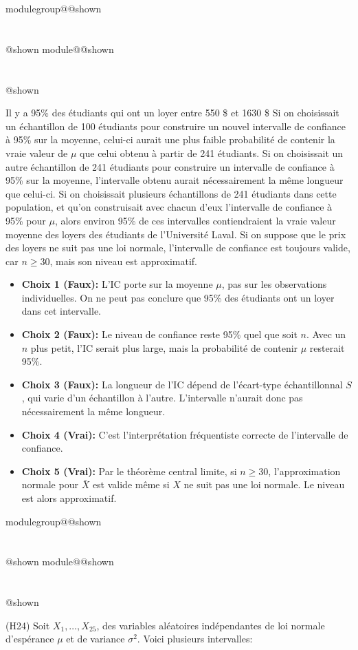 \documentclass{Evaluation}
\makeatletter
\newcommand{\currentmodulekey}{}
\newcommand{\currentmoduletitle}{}
\newcommand{\currentgroupkey}{}
\newcommand{\currentgrouptitle}{}
\newcommand{\showmoduleifneeded}{%
  \ifx\currentgroupkey\empty\else
    \expandafter\ifx\csname modulegroup@\currentgroupkey @shown\endcsname\relax
      \section*{\currentgrouptitle}%
      \expandafter\gdef\csname modulegroup@\currentgroupkey @shown\endcsname{1}%
    \fi
  \fi
  \expandafter\ifx\csname module@\currentmodulekey @shown\endcsname\relax
    \section*{\currentmoduletitle}%
    \expandafter\gdef\csname module@\currentmodulekey @shown\endcsname{1}%
  \fi
}
\newenvironment{H24}{\showmoduleifneeded}{}
\makeatother
\begin{document}
\begin{questions}
\begin{H24}
\begin{checkboxes}
\choice Il y a 95\% des étudiants qui ont un loyer entre 550 \$ et 1630 \$
\choice Si on choisissait un échantillon de 100 étudiants pour construire un nouvel intervalle de confiance à 95\% sur la moyenne, celui-ci aurait une plus faible probabilité de contenir la vraie valeur de $\mu$ que celui obtenu à partir de 241 étudiants.
\choice Si on choisissait un autre échantillon de 241 étudiants pour construire un intervalle de confiance à 95\% sur la moyenne, l'intervalle obtenu aurait nécessairement la même longueur que celui-ci.
\correctchoice Si on choisissait plusieurs échantillons de 241 étudiants dans cette population, et qu'on construisait avec chacun d'eux l'intervalle de confiance à 95\% pour $\mu$, alors environ 95\% de ces intervalles contiendraient la vraie valeur moyenne des loyers des étudiants de l'Université Laval. 
\correctchoice Si on suppose que le prix des loyers ne suit pas une loi normale, l'intervalle de confiance est toujours valide, car $n\geq 30$, mais son niveau est approximatif.
\end{checkboxes}
\begin{solution}
\begin{itemize}
    \item \textbf{Choix 1 (Faux):} L'IC porte sur la moyenne $\mu$, pas sur les observations individuelles. On ne peut pas conclure que 95\% des étudiants ont un loyer dans cet intervalle.
    \item \textbf{Choix 2 (Faux):} Le niveau de confiance reste 95\% quel que soit $n$. Avec un $n$ plus petit, l'IC serait plus large, mais la probabilité de contenir $\mu$ resterait 95\%.
    \item \textbf{Choix 3 (Faux):} La longueur de l'IC dépend de l'écart-type échantillonnal $S$, qui varie d'un échantillon à l'autre. L'intervalle n'aurait donc pas nécessairement la même longueur.
    \item \textbf{Choix 4 (Vrai):} C'est l'interprétation fréquentiste correcte de l'intervalle de confiance.
    \item \textbf{Choix 5 (Vrai):} Par le théorème central limite, si $n \geq 30$, l'approximation normale pour $\bar{X}$ est valide même si $X$ ne suit pas une loi normale. Le niveau est alors approximatif.
\end{itemize}
\end{solution}
\end{H24}

\begin{H24}
\question (H24) Soit $X_1,\hdots, X_{25}$, des variables aléatoires indépendantes de loi normale d'espérance $\mu$ et de variance $\sigma^2$. Voici plusieurs intervalles:
\begin{center}
    

\end{center}
\end{H24}
\end{questions}
\end{document}
